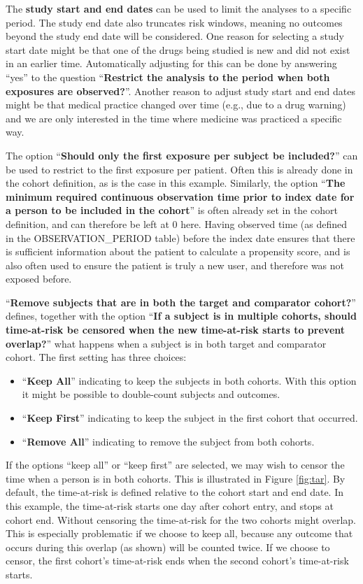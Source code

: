 \documentclass[11pt]{book}
\providecommand{\tightlist}{%
  \setlength{\itemsep}{0pt}\setlength{\parskip}{0pt}}
\theoremstyle{definition}
\theoremstyle{definition}
\theoremstyle{definition}
\theoremstyle{remark}
\begin{document}
The \textbf{study start and end dates} can be used to limit the analyses to a specific period. The study end date also truncates risk windows, meaning no outcomes beyond the study end date will be considered. One reason for selecting a study start date might be that one of the drugs being studied is new and did not exist in an earlier time. Automatically adjusting for this can be done by answering ``yes'' to the question ``\textbf{Restrict the analysis to the period when both exposures are observed?}''. Another reason to adjust study start and end dates might be that medical practice changed over time (e.g., due to a drug warning) and we are only interested in the time where medicine was practiced a specific way.

The option ``\textbf{Should only the first exposure per subject be included?}'' can be used to restrict to the first exposure per patient. Often this is already done in the cohort definition, as is the case in this example. Similarly, the option ``\textbf{The minimum required continuous observation time prior to index date for a person to be included in the cohort}'' is often already set in the cohort definition, and can therefore be left at 0 here. Having observed time (as defined in the OBSERVATION\_PERIOD table) before the index date ensures that there is sufficient information about the patient to calculate a propensity score, and is also often used to ensure the patient is truly a new user, and therefore was not exposed before.

``\textbf{Remove subjects that are in both the target and comparator cohort?}'' defines, together with the option ``\textbf{If a subject is in multiple cohorts, should time-at-risk be censored when the new time-at-risk starts to prevent overlap?}'' what happens when a subject is in both target and comparator cohort. The first setting has three choices:

\begin{itemize}
\tightlist
\item
  ``\textbf{Keep All}'' indicating to keep the subjects in both cohorts. With this option it might be possible to double-count subjects and outcomes.
\item
  ``\textbf{Keep First}'' indicating to keep the subject in the first cohort that occurred.
\item
  ``\textbf{Remove All}'' indicating to remove the subject from both cohorts.
\end{itemize}

If the options ``keep all'' or ``keep first'' are selected, we may wish to censor the time when a person is in both cohorts. This is illustrated in Figure \ref{fig:tar}. By default, the time-at-risk is defined relative to the cohort start and end date. In this example, the time-at-risk starts one day after cohort entry, and stops at cohort end. Without censoring the time-at-risk for the two cohorts might overlap. This is especially problematic if we choose to keep all, because any outcome that occurs during this overlap (as shown) will be counted twice. If we choose to censor, the first cohort's time-at-risk ends when the second cohort's time-at-risk starts.
\end{document}
